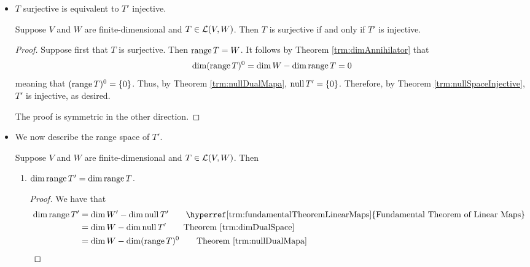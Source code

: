 \documentclass[../main.tex]{subfiles}
\begin{document}
\begin{itemize}
\begin{theorem}
\begin{enumerate}[label={\textup{(}\alph*\textup{)}},ref={\thetheorem\alph*}]
        \end{enumerate}
    \end{theorem}
    \begin{itemize}
        \item Note that the proof of part (a) does not use the hypothesis that $V,W$ are finite-dimensional, so the argument holds for infinite-dimensional vector spaces as well.
    \end{itemize}
    \item $T$ surjective is equivalent to $T'$ injective.
    \begin{theorem}
        Suppose $V$ and $W$ are finite-dimensional and $T\in\mathcal{L}(V,W)$. Then $T$ is surjective if and only if $T'$ is injective.
        \begin{proof}
            Suppose first that $T$ is surjective. Then $\operatorname{range} T=W$. It follows by Theorem \ref{trm:dimAnnihilator} that
            \begin{equation*}
                \dim(\operatorname{range} T)^0 = \dim W-\dim\operatorname{range} T = 0
            \end{equation*}
            meaning that $(\operatorname{range} T)^0=\{0\}$. Thus, by Theorem \ref{trm:nullDualMapa}, $\operatorname{null} T'=\{0\}$. Therefore, by Theorem \ref{trm:nullSpaceInjective}, $T'$ is injective, as desired.\par
            The proof is symmetric in the other direction.
        \end{proof}
    \end{theorem}
    \item We now describe the range space of $T'$.
    \begin{theorem}\label{trm:rangeDualMap}
        Suppose $V$ and $W$ are finite-dimensional and $T\in\mathcal{L}(V,W)$. Then
        \begin{enumerate}[label={\textup{(}\alph*\textup{)}},ref={\thetheorem\alph*}]
            \item \label{trm:rangeDualMapa}$\dim\operatorname{range} T'=\dim\operatorname{range} T$.
            \begin{proof}
                We have that
                \begin{align*}
                    \dim\range T' &= \dim W'-\dim\nul T'\tag*{\hyperref[trm:fundamentalTheoremLinearMaps]{Fundamental Theorem of Linear Maps}}\\
                    &= \dim W-\dim\nul T'\tag*{Theorem \ref{trm:dimDualSpace}}\\
                    &= \dim W-\dim(\range T)^0\tag*{Theorem \ref{trm:nullDualMapa}}\\

\end{align*}
\end{proof}
\end{enumerate}
\end{theorem}
\end{itemize}
\end{document}
